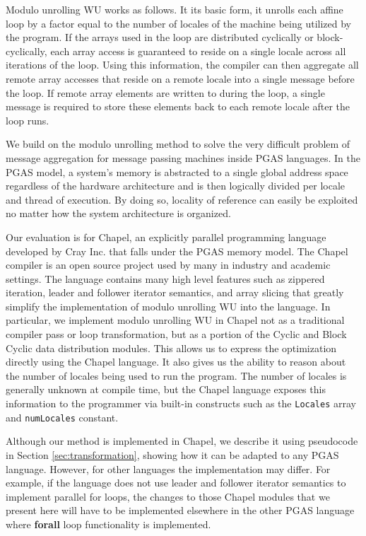 Modulo unrolling WU works as follows. It its basic form, it unrolls each affine loop by a factor equal to the number of locales of the machine being utilized by the program. If the arrays used in the loop are distributed cyclically or block-cyclically, each array access is guaranteed to reside on a single locale across all iterations of the loop. Using this information, the compiler can then aggregate all remote array accesses that reside on a remote locale into a single message before the loop. If remote array elements are written to during the loop, a single message is required to store these elements back to each remote locale after the loop runs. 

We build on the modulo unrolling method to solve the very difficult problem of message aggregation for message passing machines inside PGAS languages. In the PGAS model, a system's memory is abstracted to a single global address space regardless of the hardware architecture and is then logically divided per locale and thread of execution. By doing so, locality of reference can easily be exploited no matter how the system architecture is organized.

Our evaluation is for Chapel, an explicitly parallel programming language developed by Cray Inc. that falls under the PGAS memory model. The Chapel compiler is an open source project used by many in industry and academic settings. The language contains many high level features such as zippered iteration, leader and follower iterator semantics, and array slicing that greatly simplify the implementation of modulo unrolling WU into the language. In particular, we implement modulo unrolling WU in Chapel not as a traditional compiler pass or loop transformation, but as a portion of the Cyclic and Block Cyclic data distribution modules. This allows us to express the optimization directly using the Chapel language. It also gives us the ability to reason about the number of locales being used to run the program. The number of locales is generally unknown at compile time, but the Chapel language exposes this information to the programmer via built-in constructs such as the \texttt{Locales} array and \texttt{numLocales} constant. 

Although our method is implemented in Chapel, we describe it using pseudocode in Section \ref{sec:transformation}, showing how it can be adapted to any PGAS language. However, for other languages the implementation may differ. For example, if the language does not use leader and follower iterator semantics to implement parallel for loops, the changes to those Chapel modules that we present here will have to be implemented elsewhere in the other PGAS language where \textbf{forall} loop functionality is implemented.

